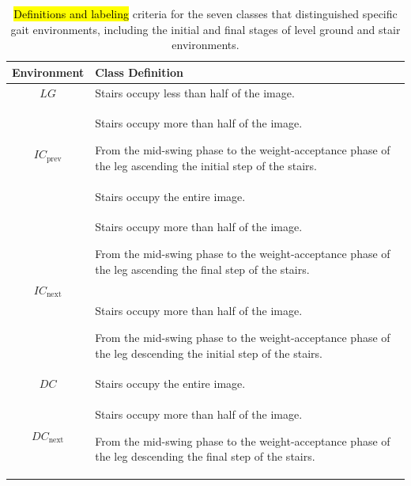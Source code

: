 \documentclass[actuators,article,accept,pdftex,moreauthors]{Definitions/mdpi}
\begin{document}
\begin{table}[H] 
\caption{\hl{Definitions and labeling} 
 criteria for the seven classes that distinguished specific gait environments, including the initial and final stages of level ground and stair environments.\label{tab5}}
\begin{tabularx}{\textwidth}{cX}%
\toprule
\textbf{Environment}&\textbf{Class Definition}\\
\midrule
$LG$		                   & Stairs occupy less than half of the image.			\\
\hline
\multirow[m]{2}{*}{$IC_{\text{prev}}$}	& Stairs occupy more than half of the image. \par From the mid-swing phase to the weight-acceptance phase of the leg ascending the initial step of the stairs.\\
\hline
$IC$	& Stairs occupy the entire image.			\\
\hline
\multirow[m]{2}{*}{$IC_{\text{next}}$}		 &Stairs occupy more than half of the image. \par From the mid-swing phase to the weight-acceptance phase of the leg ascending the final step of the stairs.\\
\hline
\multirow[m]{2}{*}{$DC_{\text{prev}}$}     & Stairs occupy more than half of the image. \par From the mid-swing phase to the weight-acceptance phase of the leg descending the initial step of the stairs.\\
\hline
$DC$	& Stairs occupy the entire image.\\
\hline
\multirow[m]{2}{*}{$DC_{\text{next}}$}	    & Stairs occupy more than half of the image. \par From the mid-swing phase to the weight-acceptance phase of the leg descending the final step of the stairs.\\
\bottomrule
\end{tabularx}
\end{table}
\end{document}
